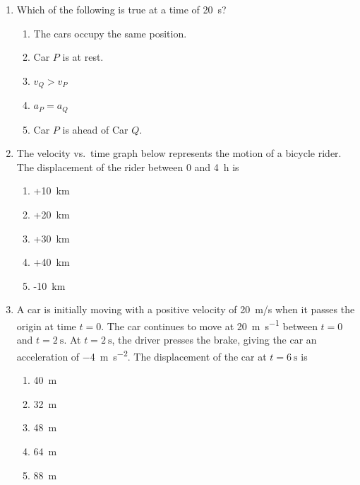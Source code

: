 \documentclass{../../../oss-apphys}
\begin{document}
\begin{multicols}{2}
\begin{enumerate}[resume,leftmargin=18pt]
  \item Which of the following is true at a time of \SI{20}{\second}?
    \begin{enumerate}[noitemsep,topsep=0pt,leftmargin=18pt,label=(\Alph*)]
    \item The cars occupy the same position.
    \item Car $P$ is at rest.
    \item $v_Q>v_P$
    \item $a_P=a_Q$
    \item Car $P$ is ahead of Car $Q$.
    \end{enumerate}
    \label{q:graph2}
    
  \item The velocity vs.\ time graph below represents the motion of a bicycle
    rider. The displacement of the rider between $0$ and \SI{4}{\hour} is
    \begin{center}
    \end{center}
    \begin{enumerate}[noitemsep,topsep=0pt,leftmargin=18pt,label=(\Alph*)]
    \item +\SI{10}{\kilo\metre}
    \item +\SI{20}{\kilo\metre}
    \item +\SI{30}{\kilo\metre}
    \item +\SI{40}{\kilo\metre}
    \item -\SI{10}{\kilo\metre}
    \end{enumerate}
    
  \item A car is initially moving with a positive velocity of \SI{20}{m/s} when
    it passes the origin at time $t=0$. The car continues to move at
    \SI{20}{\metre\per\second} between $t=0$ and $t=\SI{2}{\second}$. At
    $t=\SI{2}{\second}$, the driver presses the brake, giving the car an
    acceleration of \SI{-4}{\metre\per\second^2}. The displacement of the car
    at $t=\SI{6}{\second}$ is
    \begin{enumerate}[noitemsep,topsep=0pt,leftmargin=18pt,label=(\Alph*)]
    \item\SI{40}{\metre}
    \item\SI{32}{\metre}
    \item\SI{48}{\metre}
    \item\SI{64}{\metre}
    \item\SI{88}{\metre}
    \end{enumerate}


\end{enumerate}
\end{multicols}
\end{document}
